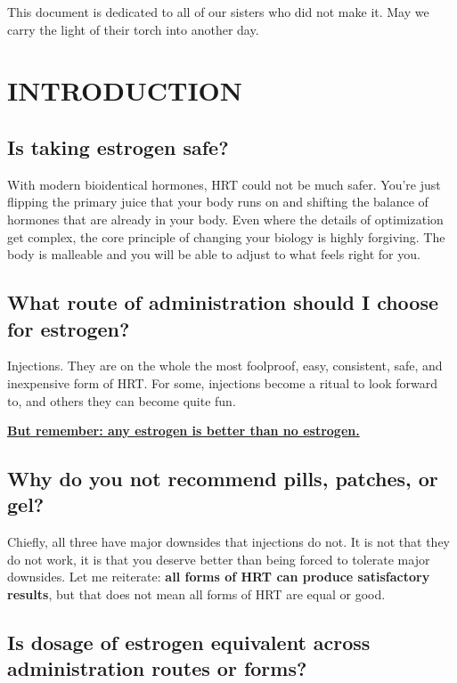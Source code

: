 \documentclass{article}
\begin{document}
This document is dedicated to all of our sisters who did not make it. May we carry the light of their torch into another day.



\section{INTRODUCTION}

\subsection{Is taking estrogen safe?}

With modern bioidentical hormones, HRT could not be much safer. You’re just flipping the primary juice that your body runs on and shifting the balance of hormones that are already in your body. Even where the details of optimization get complex, the core principle of changing your biology is highly forgiving. The body is malleable and you will be able to adjust to what feels right for you.

\subsection{What route of administration should I choose for estrogen?}

Injections. They are on the whole the most foolproof, easy, consistent, safe, and inexpensive form of HRT. For some, injections become a ritual to look forward to, and others they can become quite fun.

\noindent\underline{\textbf{But remember: any estrogen is better than no estrogen.}}

\subsection{Why do you not recommend pills, patches, or gel?}

Chiefly, all three have major downsides that injections do not. It is not that they do not work, it is that you deserve better than being forced to tolerate major downsides. Let me reiterate: \textbf{all forms of HRT can produce satisfactory results}, but that does not mean all forms of HRT are equal or good.

\subsection{Is dosage of estrogen equivalent across administration routes or forms?}
\end{document}
